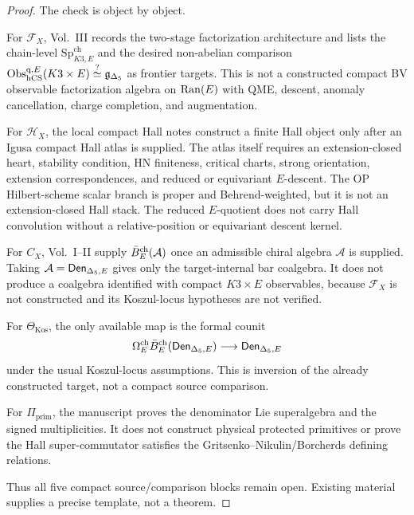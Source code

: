 \begin{proof}
The check is object by object.

For \(\mathcal F_X\), Vol.~III records the two-stage
factorization architecture and lists the chain-level
\(\mathrm{Sp}^{\mathrm{ch}}_{K3,E}\) and the desired non-abelian
comparison
\(\operatorname{Obs}^{\mathrm q,E}_{\mathrm{hCS}}(K3\times E)\stackrel{?}{\simeq}\mathfrak g_{\Delta_5}\)
as frontier targets.  This is not a constructed compact BV observable
factorization algebra on \(\operatorname{Ran}(E)\) with QME, descent, anomaly
cancellation, charge completion, and augmentation.

For \(\mathcal H_X\), the local compact Hall notes construct a finite
Hall object only after an Igusa compact Hall atlas is supplied.  The
atlas itself requires an extension-closed heart, stability condition,
HN finiteness, critical charts, strong orientation, extension
correspondences, and reduced or equivariant \(E\)-descent.  The OP
Hilbert-scheme scalar branch is proper and Behrend-weighted, but it is
not an extension-closed Hall stack.  The reduced \(E\)-quotient does not
carry Hall convolution without a relative-position or equivariant
descent kernel.

For \(C_X\), Vol.~I--II supply \(\bar B_E^{\mathrm{ch}}(\mathcal A)\)
once an admissible chiral algebra \(\mathcal A\) is supplied.  Taking
\(\mathcal A=\mathsf{Den}_{\Delta_5,E}\) gives only the target-internal bar
coalgebra.  It does not produce a coalgebra identified with compact
\(K3\times E\) observables, because \(\mathcal F_X\) is not constructed
and its Koszul-locus hypotheses are not verified.

For \(\Theta_{\mathrm{Kos}}\), the only available map is the formal
counit
$$
\Omega^{\mathrm{ch}}_E\bar B_E^{\mathrm{ch}}(\mathsf{Den}_{\Delta_5,E})
\longrightarrow
\mathsf{Den}_{\Delta_5,E}
$$
under the usual Koszul-locus assumptions.  This is inversion of the
already constructed target, not a compact source comparison.

For \(\Pi_{\mathrm{prim}}\), the manuscript proves the denominator
Lie superalgebra and the signed multiplicities.  It does not construct
physical protected primitives or prove the Hall super-commutator
satisfies the Gritsenko--Nikulin/Borcherds defining relations.

Thus all five compact source/comparison blocks remain open.  Existing
material supplies a precise template, not a theorem.
\end{proof}

